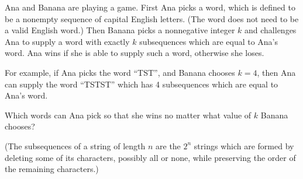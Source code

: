 Ana and Banana are playing a game. First Ana picks a word, which is defined to be a nonempty sequence of capital English letters. (The word does not need to be a valid English word.) Then Banana picks a nonnegative integer $k$ and challenges Ana to supply a word with exactly $k$ subsequences which are equal to Ana's word. Ana wins if she is able to supply such a word, otherwise she loses.

For example, if Ana picks the word ``TST'', and Banana chooses $k=4$, then Ana can supply the word ``TSTST'' which has 4 subsequences which are equal to Ana's word.

Which words can Ana pick so that she wins no matter what value of $k$ Banana chooses?

(The subsequences of a string of length $n$ are the $2^n$ strings which are formed by deleting some of its characters, possibly all or none, while preserving the order of the remaining characters.)